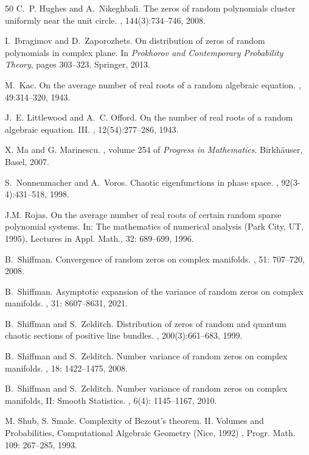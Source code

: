 \documentclass[11pt,leqno,oneside]{amsart}
\numberwithin{equation}{section}
\begin{document}
\begin{thebibliography}{50}
C.~P. Hughes and A.~Nikeghbali.
\newblock The zeros of random polynomials cluster uniformly near the unit circle.
, 144(3):734--746, 2008.

I.~Ibragimov and D.~Zaporozhets.
\newblock On distribution of zeros of random polynomials in complex plane.
\newblock In {\em Prokhorov and Contemporary Probability Theory}, pages 303--323. Springer, 2013.

M.~Kac.
\newblock On the average number of real roots of a random algebraic equation.
, 49:314--320, 1943.

J.~E. Littlewood and A.~C. Offord.
\newblock On the number of real roots of a random algebraic equation. {III}.
, 12(54):277--286, 1943.

X. Ma and G. Marinescu.
, volume 254 of {\em Progress in Mathematics}.
\newblock Birkh\"{a}user, Basel, 2007.

S.~Nonnenmacher and A.~Voros.
\newblock Chaotic eigenfunctions in phase space.
, 92(3-4):431--518, 1998.

J.M. Rojas.
\newblock On the average number of real roots of certain random sparse polynomial systems.
 In: The mathematics of numerical analysis (Park City, UT, 1995), Lectures in Appl. Math., 32: 689--699, 1996.

B.~Shiffman.
\newblock Convergence of random zeros on complex manifolds.
, 51: 707--720, 2008.

B.~Shiffman.
\newblock Asymptotic expansion of the variance of random zeros on complex manifolds.
, 31: 8607--8631, 2021.

B.~Shiffman and S.~Zelditch.
\newblock Distribution of zeros of random and quantum chaotic sections of positive line bundles.
, 200(3):661--683, 1999.

B.~Shiffman and S.~Zelditch.
\newblock Number variance of random zeros on complex manifolds.
, 18: 1422--1475, 2008.

B.~Shiffman and S.~Zelditch.
\newblock Number variance of random zeros on complex manifolds, II: Smooth Statistics.
, 6(4): 1145--1167, 2010.

M. Shub, S. Smale.
\newblock Complexity of Bezout’s theorem. II. Volumes and Probabilities, Computational Algebraic Geometry (Nice, 1992)
, Progr. Math. 109: 267--285, 1993.

\end{thebibliography}
\end{document}
